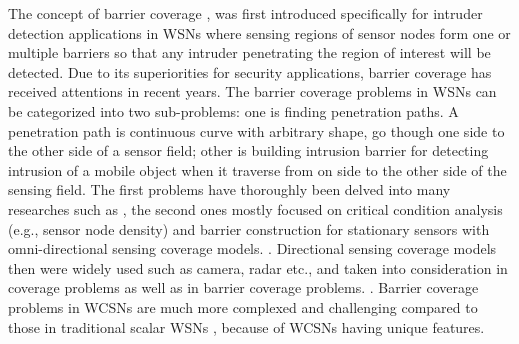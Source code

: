 The concept of barrier coverage \cite{kumar2005barrier}, was first introduced specifically for intruder detection applications in WSNs where sensing regions of sensor nodes form one or multiple barriers so that any intruder penetrating the region of interest will be detected. Due to its superiorities for security applications, barrier coverage has received attentions in recent years. The barrier coverage problems in WSNs can be categorized into two sub-problems: one is finding penetration paths. A penetration path is continuous curve with arbitrary shape, go though one side to the other side of a sensor field; other is building intrusion barrier for detecting intrusion of a mobile object when it traverse from on side to the other side of the sensing field. The first problems have thoroughly been delved into many researches such as \cite{megerian2002exposure,binh2016heuristic,liu2013percolation,binh2017genetic,binh2019efficient}, the second ones mostly focused on critical condition analysis (e.g., sensor node density) and barrier construction for stationary sensors with omni-directional sensing coverage models. \cite{liu2008strong,saipulla2008barrier,he2010distributed,skraba2007energy,chen2013energy}. Directional sensing coverage models then were widely used such as camera, radar etc., and taken into consideration in coverage problems as well as in barrier coverage problems.
\cite{ai2006coverage,akyildiz2007survey,guvensan2011coverage,ma2005coverage,soro2005coverage}. Barrier coverage problems in WCSNs are much more complexed and challenging compared to those in traditional scalar WSNs \cite{chang2006collaborative,ma2012minimum,makhoul2009adaptive,wang2011barrier}, because of WCSNs having unique features.
 
